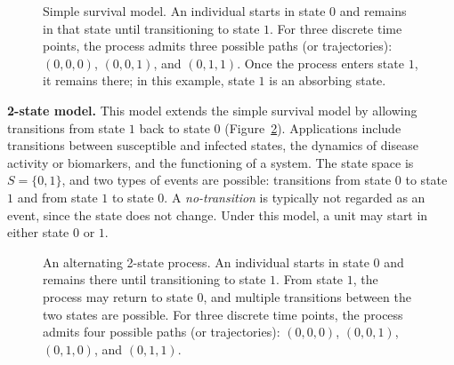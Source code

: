 \documentclass[11pt, a4paper]{article}
\numberwithin{equation}{section}
\theoremstyle{plain}
\theoremstyle{definition}
\renewcommand{\emph}[1]{\textit{#1}}
\begin{document}
\begin{figure}[!ht]
\begin{center}
\end{center}
\caption{Simple survival model. An individual starts in state $0$ and remains in that state until transitioning to state $1$. For three discrete time points, the process admits three possible paths (or trajectories): $(0,0,0)$, $(0,0,1)$, and $(0,1,1)$. Once the process enters state $1$, it remains there; in this example, state $1$ is an absorbing state.}\label{fig:survival}
\end{figure}
\textbf{2-state model.} This model extends the simple survival model by allowing transitions from state $1$ back to state $0$ (Figure~\ref{fig:2state}). Applications include transitions between susceptible and infected states, the dynamics of disease activity or biomarkers, and the functioning of a system. The state space is $S=\{0,1\}$, and two types of events are possible: transitions from state $0$ to state $1$ and from state $1$ to state $0$. A \emph{no-transition} is typically not regarded as an event, since the state does not change. Under this model, a unit may start in either state $0$ or $1$.



\begin{figure}[!ht]
\begin{center}
\end{center}
\caption{An alternating 2-state process. An individual starts in state $0$ and remains there until transitioning to state $1$. From state $1$, the process may return to state $0$, and multiple transitions between the two states are possible. For three discrete time points, the process admits four possible paths (or trajectories): $(0,0,0)$, $(0,0,1)$, $(0,1,0)$, and $(0,1,1)$.}
\label{fig:2state}
\end{figure}
\end{document}
